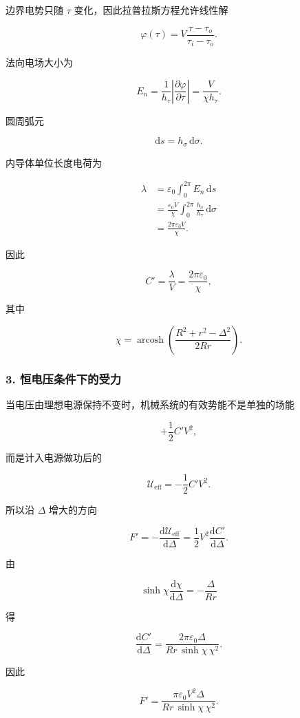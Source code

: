 边界电势只随 \(\tau\) 变化，因此拉普拉斯方程允许线性解

\[
\varphi(\tau)
=
V\frac{\tau-\tau_o}{\tau_i-\tau_o}.
\]

法向电场大小为

\[
E_n
=
\frac1{h_{\tau}}
\left|\frac{\partial\varphi}{\partial\tau}\right|
=
\frac{V}{\chi h_{\tau}}.
\]

圆周弧元

\[
\mathrm ds=h_{\sigma}\,\mathrm d\sigma.
\]

内导体单位长度电荷为

\[
\begin{aligned}
\lambda
&=
\varepsilon_0\int_0^{2\pi}E_n\,\mathrm ds\\
&=
\frac{\varepsilon_0V}{\chi}
\int_0^{2\pi}
\frac{h_{\sigma}}{h_{\tau}}\,\mathrm d\sigma\\
&=
\frac{2\pi\varepsilon_0V}{\chi}.
\end{aligned}
\]

因此

\[
\boxed{
C'
=
\frac{\lambda}{V}
=
\frac{2\pi\varepsilon_0}{\chi}
},
\]

其中

\[
\boxed{
\chi
=
\operatorname{arcosh}
\left(
\frac{R^2+r^2-\Delta^2}{2Rr}
\right)
}.
\]

\subsubsection{3.
恒电压条件下的受力}\label{m2:ux6052ux7535ux538bux6761ux4ef6ux4e0bux7684ux53d7ux529b}

当电压由理想电源保持不变时，机械系统的有效势能不是单独的场能

\[
+\frac12C'V^2,
\]

而是计入电源做功后的

\[
\mathcal U_{\text{eff}}
=
-\frac12C'V^2.
\]

所以沿 \(\Delta\) 增大的方向

\[
F'
=
-\frac{\mathrm d\mathcal U_{\text{eff}}}{\mathrm d\Delta}
=
\frac12V^2\frac{\mathrm dC'}{\mathrm d\Delta}.
\]

由

\[
\sinh\chi\frac{\mathrm d\chi}{\mathrm d\Delta}
=
-\frac{\Delta}{Rr}
\]

得

\[
\frac{\mathrm dC'}{\mathrm d\Delta}
=
\frac{2\pi\varepsilon_0\Delta}
{Rr\,\sinh\chi\,\chi^2}.
\]

因此

\[
\boxed{
F'
=
\frac{\pi\varepsilon_0V^2\Delta}
{Rr\,\sinh\chi\,\chi^2}
}.
\]

